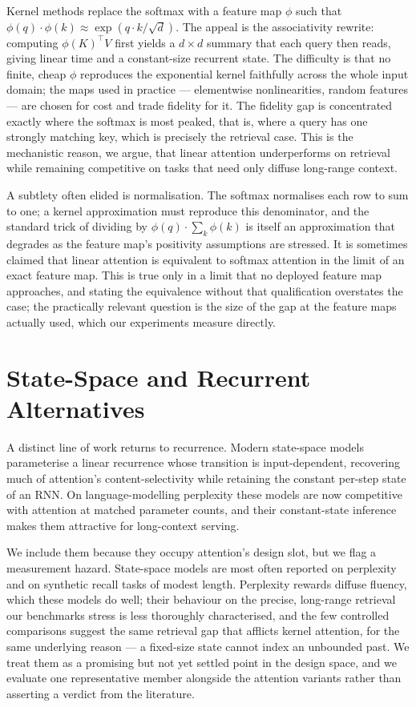 \documentclass[11pt]{article}
\begin{document}
Kernel methods replace the softmax with a feature map $\phi$ such that $\phi(q) \cdot \phi(k) \approx \exp(q \cdot k / \sqrt{d})$. The appeal is the associativity rewrite: computing $\phi(K)^\top V$ first yields a $d \times d$ summary that each query then reads, giving linear time and a constant-size recurrent state. The difficulty is that no finite, cheap $\phi$ reproduces the exponential kernel faithfully across the whole input domain; the maps used in practice --- elementwise nonlinearities, random features --- are chosen for cost and trade fidelity for it. The fidelity gap is concentrated exactly where the softmax is most peaked, that is, where a query has one strongly matching key, which is precisely the retrieval case. This is the mechanistic reason, we argue, that linear attention underperforms on retrieval while remaining competitive on tasks that need only diffuse long-range context.

A subtlety often elided is normalisation. The softmax normalises each row to sum to one; a kernel approximation must reproduce this denominator, and the standard trick of dividing by $\phi(q) \cdot \sum_k \phi(k)$ is itself an approximation that degrades as the feature map's positivity assumptions are stressed. It is sometimes claimed that linear attention is equivalent to softmax attention in the limit of an exact feature map. This is true only in a limit that no deployed feature map approaches, and stating the equivalence without that qualification overstates the case; the practically relevant question is the size of the gap at the feature maps actually used, which our experiments measure directly.

\section{State-Space and Recurrent Alternatives}
\label{sec:ssm}

A distinct line of work returns to recurrence. Modern state-space models parameterise a linear recurrence whose transition is input-dependent, recovering much of attention's content-selectivity while retaining the constant per-step state of an RNN. On language-modelling perplexity these models are now competitive with attention at matched parameter counts, and their constant-state inference makes them attractive for long-context serving.

We include them because they occupy attention's design slot, but we flag a measurement hazard. State-space models are most often reported on perplexity and on synthetic recall tasks of modest length. Perplexity rewards diffuse fluency, which these models do well; their behaviour on the precise, long-range retrieval our benchmarks stress is less thoroughly characterised, and the few controlled comparisons suggest the same retrieval gap that afflicts kernel attention, for the same underlying reason --- a fixed-size state cannot index an unbounded past. We treat them as a promising but not yet settled point in the design space, and we evaluate one representative member alongside the attention variants rather than asserting a verdict from the literature.
\end{document}
